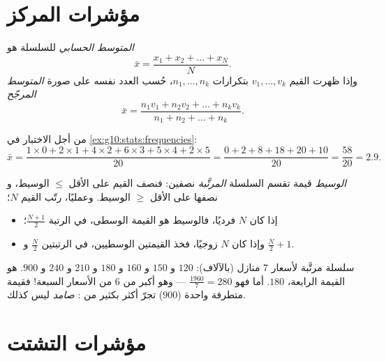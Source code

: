 \section{مؤشرات المركز}

\begin{definition}\label{def:g10:stats:mean}
\emph{المتوسط الحسابي} للسلسلة هو
\[
\bar x = \frac{x_1 + x_2 + \dots + x_N}{N}.
\]
وإذا ظهرت القيم $v_1, \dots, v_k$ بتكرارات $n_1, \dots, n_k$، حُسب
العدد نفسه على صورة \emph{المتوسط المرجّح}
\[
\bar x = \frac{n_1 v_1 + n_2 v_2 + \dots + n_k v_k}{n_1 + n_2 + \dots + n_k}.
\]
\end{definition}

\begin{example}\label{ex:g10:stats:mean}
من أجل الاختبار في \cref{ex:g10:stats:frequencies}:
\[
\bar x = \frac{1 \times 0 + 2 \times 1 + 4 \times 2 + 6 \times 3
+ 5 \times 4 + 2 \times 5}{20}
= \frac{0 + 2 + 8 + 18 + 20 + 10}{20}
= \frac{58}{20} = 2.9 .
\]
\end{example}

\begin{definition}[الوسيط]\label{def:g10:stats:median}
\emph{الوسيط} قيمة تقسم السلسلة \emph{المرتَّبة}
نصفين: فنصف القيم على الأقل $\leq$ الوسيط، و
نصفها على الأقل $\geq$ الوسيط. وعمليًا، رتّب القيم $N$؛
\begin{itemize}
  \item إذا كان $N$ فرديًا، فالوسيط هو القيمة الوسطى، في الرتبة
        $\frac{N+1}{2}$؛
  \item وإذا كان $N$ زوجيًا، فخذ  القيمتين الوسطيين، في
        الرتبتين $\frac N2$ و $\frac N2 + 1$.
\end{itemize}
\end{definition}

\begin{example}\label{ex:g10:stats:median}
سلسلة مرتَّبة لأسعار $7$ منازل (بالآلاف): $120$ و $150$ و $160$ و
$180$ و $210$ و $240$ و $900$.  هو القيمة الرابعة، $180$. أما  فهو $\frac{1960}{7} = 280$ --- وهو أكبر من $6$ من الأسعار السبعة!
فقيمة متطرفة واحدة ($900$) تجرّ  أكثر بكثير من :
 \emph{صامد}  ليس كذلك.
\end{example}

\section{مؤشرات التشتت}

